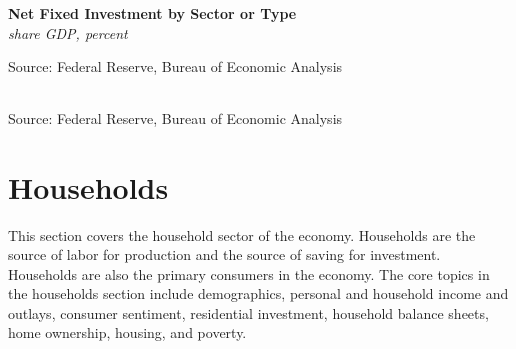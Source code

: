 \documentclass{report}
\makeatletter
\newcommand{\tbllink}[1]{\href{https://raw.githubusercontent.com/bdecon/US-chartbook/master/chartbook/data/#1}{\faTable}}
\newcommand*\short[1]{\expandafter\@gobbletwo\number\numexpr#1\relax}
\newcommand{\sbar}[4]{
		\addplot[ybar stacked, bar width=2.3pt, draw opacity=0, fill=#1] 
			table [x=#2, y=#3, col sep=comma]{#4};}
\newcommand{\dateaxisticks}{
		date coordinates in=x, axis line style={draw=none},
		xmax={2023-11-01},
		max space between ticks=40,	    
		xtick={{1990-01-01}, {1992-01-01}, {1994-01-01}, 
			{1996-01-01}, {1998-01-01}, {2000-01-01}, 
			{2002-01-01}, {2004-01-01}, {2006-01-01},
			{2008-01-01}, {2010-01-01}, {2012-01-01}, {2014-01-01},
		    {2016-01-01}, {2018-01-01}, {2020-01-01}, {2022-01-01}, 
		    {2024-01-01}, {2026-01-01}},
		minor xtick={{1989-01-01}, {1991-01-01}, {1993-01-01},
			{1995-01-01}, {1997-01-01}, {1999-01-01}, 
			{2001-01-01}, {2003-01-01}, {2005-01-01}, {2007-01-01},
		    {2009-01-01}, {2011-01-01}, {2013-01-01}, {2015-01-01},
		    {2017-01-01}, {2019-01-01}, {2021-01-01}, {2023-01-01}, 
		    {2025-01-01}, {2027-01-01}},
		enlarge y limits={0.06}, enlarge x limits={0.01},
		}
\newcommand{\bbar}[2]{extra #1 ticks = {{#2}}, extra #1 tick labels = ,
		extra #1 tick style = {grid=major, grid style={thick, black!25}},}
\newcommand{\rbars}{
		\fill[color=black!10] (axis cs:{1990-07-01},\pgfkeysvalueof{/pgfplots/ymin}) rectangle 
			(axis cs:{1991-03-01}, \pgfkeysvalueof{/pgfplots/ymax});
		\fill[color=black!10] (axis cs:{2007-12-01},\pgfkeysvalueof{/pgfplots/ymin}) rectangle 
			(axis cs:{2009-07-01}, \pgfkeysvalueof{/pgfplots/ymax});
		\fill[color=black!10] (axis cs:{2001-03-01},\pgfkeysvalueof{/pgfplots/ymin}) rectangle 
			(axis cs:{2001-11-01}, \pgfkeysvalueof{/pgfplots/ymax});
		\fill[color=black!10] (axis cs:{2020-02-01},\pgfkeysvalueof{/pgfplots/ymin}) rectangle 
			(axis cs:{2020-05-01}, \pgfkeysvalueof{/pgfplots/ymax});}
\makeatother
\begin{document}
{\begin{minipage}{0.76\textwidth}
\small 
\vspace{0.5mm}

\normalsize \textbf{Net Fixed Investment by Sector or Type}\\
\footnotesize{\textit{share GDP, percent}}
\vspace{2.2cm}

\hspace{2mm} 

\footnotesize{Source: Federal Reserve, Bureau of Economic Analysis} \hfill \tbllink{z1_nfi.csv}

 \setlength{\tabcolsep}{3.5pt} \color{black!90}
		{\renewcommand{\arraystretch}{1.54}
		 \begin{tabular}{p{42mm} R{7.8mm} R{7.8mm} R{7.8mm} R{7.8mm} 
		   R{8.2mm} R{8.2mm} R{8.2mm} }
			  \hline
		\end{tabular}}	\vspace{-2mm}
		
\footnotesize{Source: Federal Reserve, Bureau of Economic Analysis}
\end{minipage}
\newpage
\hypertarget{hh}{\label{hh}}
\section*{Households} 
\begin{minipage}{0.76\textwidth}
\small This section covers the household sector of the economy. Households are the source of labor for production and the source of saving for investment. Households are also the primary consumers in the economy. The core topics in the households section include demographics, personal and household income and outlays, consumer sentiment, residential investment, household balance sheets, home ownership, housing, and poverty.


\end{minipage}}
\end{document}
